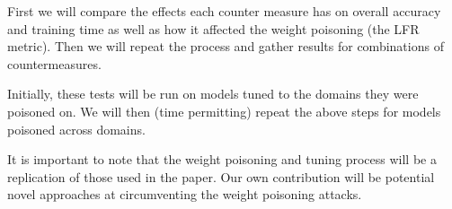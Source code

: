 \documentclass[11pt,a4paper]{article}
\begin{document}
First we will compare the effects each counter measure has on overall accuracy and training time as well as how it affected the weight poisoning (the LFR metric). Then we will repeat the process and gather results for combinations of countermeasures.

Initially, these tests will be run on models tuned to the domains they were poisoned on. We will then (time permitting) repeat the above steps for models poisoned across domains.

It is important to note that the weight poisoning and tuning process will be a replication of those used in the paper. Our own contribution will be potential novel approaches at circumventing the weight poisoning attacks.




\end{document}
